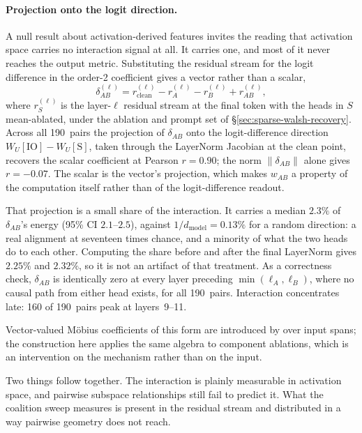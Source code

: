 \documentclass{article}
\begin{document}
\paragraph{Projection onto the logit direction.}
A null result about activation-derived features invites the reading that activation
space carries no interaction signal at all. It carries one, and most of it never
reaches the output metric. Substituting the residual stream
for the logit difference in the order-2 coefficient gives a vector rather than a
scalar,
\begin{equation}
\delta_{AB}^{(\ell)}
  = r^{(\ell)}_{\text{clean}} - r^{(\ell)}_{A} - r^{(\ell)}_{B}
    + r^{(\ell)}_{AB},
\label{eq:delta-vector}
\end{equation}
where $r^{(\ell)}_{S}$ is the layer-$\ell$ residual stream at the final token with the
heads in $S$ mean-ablated, under the ablation and prompt set of
\S\ref{sec:sparse-walsh-recovery}. Across all 190~pairs the projection of $\delta_{AB}$ onto the logit-difference
direction $W_U[\text{IO}] - W_U[\text{S}]$, taken through the LayerNorm Jacobian at
the clean point, recovers the scalar coefficient at Pearson $r = 0.90$; the norm
$\lVert \delta_{AB} \rVert$ alone gives $r = {-}0.07$. The scalar is the vector's
projection, which makes $w_{AB}$ a property of the computation itself rather than of
the logit-difference readout.

That projection is a small share of the interaction. It carries a median $2.3\%$ of
$\delta_{AB}$'s energy (95\% CI $2.1$--$2.5$), against $1/d_{\text{model}} = 0.13\%$
for a random direction: a real alignment at seventeen times chance, and a minority of
what the two heads do to each other. Computing the share before and after the final
LayerNorm gives $2.25\%$ and $2.32\%$, so it is not an artifact of that treatment. As a correctness check, $\delta_{AB}$
is identically zero at every layer preceding $\min(\ell_A, \ell_B)$, where no causal
path from either head exists, for all 190~pairs. Interaction concentrates late: 160 of 190~pairs peak at layers~9--11.

Vector-valued M\"obius coefficients of this form are introduced by
\citet{jansma2026compositional} over input spans; the construction
here applies the same algebra to component ablations, which is an intervention on the
mechanism rather than on the input.

Two things follow together. The interaction is plainly measurable in activation
space, and pairwise subspace relationships still fail to predict it. What the coalition
sweep measures is present in the residual stream and distributed in a way pairwise
geometry does not reach.
\end{document}
